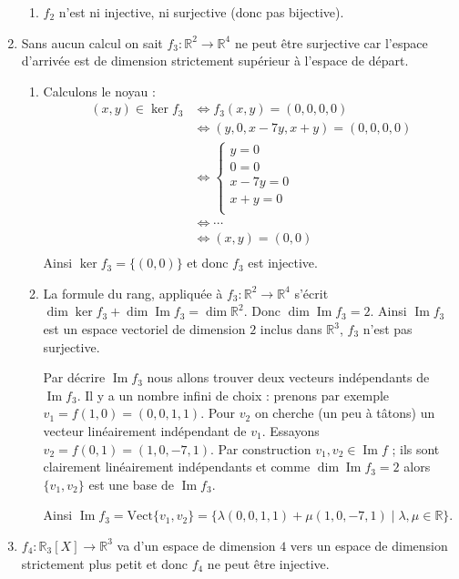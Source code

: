 \documentclass[11pt,a4paper]{article}
\newcommand{\Rr}{\mathbb{R}} \newcommand{\R}{\mathbb{R}}
\renewcommand{\Im}{\mathop{\mathrm{Im}}\nolimits}
\begin{document}
\begin{enumerate}
\begin{enumerate}
  \item $f_2$ n'est ni injective, ni surjective (donc pas bijective).
  \end{enumerate}


  \item Sans aucun calcul on sait $f_3: \Rr^2 \to \Rr^4$ ne peut être surjective 
car l'espace d'arrivée est de dimension strictement
supérieur à l'espace de départ. 
  \begin{enumerate}
  \item Calculons le noyau :
\begin{align*}
(x,y) \in \ker f_3
  & \iff f_3(x,y) = (0,0,0,0) \\
  & \iff  (y,0,x-7y,x+y) = (0,0,0,0) \\
  & \iff \begin{cases}
         y = 0 \\
         0  = 0 \\   
         x-7y = 0 \\ 
         x+y = 0 \\ 
        \end{cases} \\
  & \iff \cdots \\ 
  & \iff (x,y)=(0,0) \\
\end{align*}
Ainsi $\ker f_3 = \{ (0,0) \}$ et donc $f_3$ est injective.

  \item La formule du rang, appliquée à $f_3 : \Rr^2 \to \Rr^4$ s'écrit 
$\dim \ker f_3 + \dim \Im f_3 = \dim \Rr^2$. Donc $\dim \Im f_3 = 2$.
Ainsi $\Im f_3$ est un espace vectoriel de dimension $2$ inclus dans $\Rr^3$,
 $f_3$ n'est pas surjective.

Par décrire $\Im f_3$ nous allons trouver deux vecteurs indépendants de $\Im f_3$.
Il y a un nombre infini de choix : prenons par exemple 
$v_1 = f(1,0) = (0,0,1,1)$. Pour $v_2$ on cherche (un peu à tâtons) un vecteur linéairement indépendant de $v_1$.
Essayons $v_2 = f(0,1)=(1,0,-7,1)$. Par construction $v_1,v_2 \in \Im f$ ; ils sont clairement linéairement indépendants
et comme $\dim \Im f_3=2$ alors $\{v_1,v_2\}$ est une base de $\Im f_3$.

Ainsi $\Im f_3= \text{Vect}\{v_1,v_2\} =\big\{ \lambda(0,0,1,1) + \mu (1,0,-7,1) \mid \lambda,\mu \in \Rr \big\}$.
  \end{enumerate}

  
  
  \item $f_4 : \Rr_3[X] \to \Rr^3$ va d'un espace de dimension $4$ vers un espace de dimension strictement plus petit
et donc $f_4$ ne peut être injective.


\end{enumerate}
\end{document}
